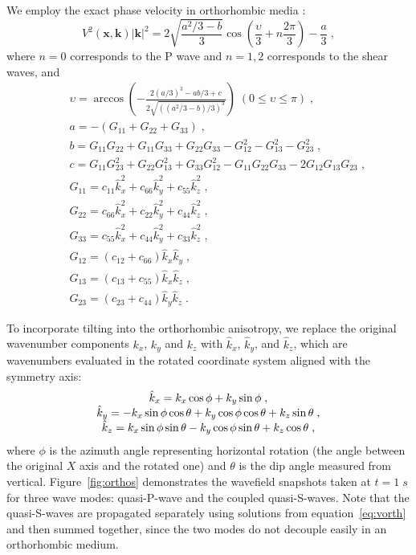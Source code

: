 We employ the exact phase velocity in orthorhombic media \cite[]{tsvankin97}:
\begin{equation}
\label{eq:vorth}
V^2(\mathbf{x},\mathbf{k})|\mathbf{k}|^2 = 2\sqrt{\frac{a^2/3-b}{3}}\cos \left( \frac{\upsilon}{3}+n\frac{2\pi}{3} \right)-\frac{a}{3} \; ,
\end{equation}
where $n=0$ corresponds to the P wave and $n=1,2$ corresponds to the shear waves, and
\begin{eqnarray}
\label{eq:misc}
&& \upsilon = \arccos \left( -\frac{2(a/3)^3 -ab/3 + c}{2\sqrt{((a^2/3-b)/3)^3}} \right) \; (0 \leq \upsilon \leq \pi) \; , \\
&& a = -(G_{11}+G_{22}+G_{33}) \; , \\
&& b = G_{11}G_{22} + G_{11}G_{33} + G_{22}G_{33} - G_{12}^2 - G_{13}^2 - G_{23}^2 \; , \\
&& c = G_{11}G_{23}^2 + G_{22}G_{13}^2 + G_{33}G_{12}^2 - G_{11}G_{22}G_{33} - 2G_{12}G_{13}G_{23} \; , \\
&& G_{11} = c_{11}\hat{k}_x^2 + c_{66}\hat{k}_y^2 + c_{55}\hat{k}_z^2 \; , \\
&& G_{22} = c_{66}\hat{k}_x^2 + c_{22}\hat{k}_y^2 + c_{44}\hat{k}_z^2 \; , \\
&& G_{33} = c_{55}\hat{k}_x^2 + c_{44}\hat{k}_y^2 + c_{33}\hat{k}_z^2 \; , \\
&& G_{12} = (c_{12} + c_{66})\hat{k}_x\hat{k}_y \; , \\
&& G_{13} = (c_{13} + c_{55})\hat{k}_x\hat{k}_z \; , \\
&& G_{23} = (c_{23} + c_{44})\hat{k}_y\hat{k}_z \; .
\end{eqnarray}

To incorporate tilting into the orthorhombic anisotropy, we replace the original wavenumber components $k_x$, $k_y$ and $k_z$ with $\hat{k}_x$, $\hat{k}_y$, and $\hat{k}_z$, which are wavenumbers evaluated in the rotated coordinate system aligned with the symmetry axis:
\begin{equation}
\label{eq:orthotilt}
\begin{array}{*{20}c}
\hat{k}_x=k_x\cos{\phi}+k_y\sin{\phi}\;,\\ 
\hat{k}_y=-k_x\sin{\phi}\cos{\theta}+k_y\cos{\phi}\cos{\theta}+k_z\sin{\theta}\;,\\ 
\hat{k}_z=k_x\sin{\phi}\sin{\theta}-k_y\cos{\phi}\sin{\theta}+k_z\cos{\theta}\;,\\ 
 \end{array}
\end{equation}
where $\phi$ is the azimuth angle representing horizontal rotation (the angle between the original $X$ axis and the rotated one) and $\theta$ is the dip angle measured from vertical. Figure~\ref{fig:orthos} demonstrates the wavefield snapshots taken at $t=1\;s$ for three wave modes: quasi-P-wave and the coupled quasi-S-waves. Note that the quasi-S-waves are propagated separately using solutions from equation~\ref{eq:vorth} and then summed together, since the two modes do not decouple easily in an orthorhombic medium.

